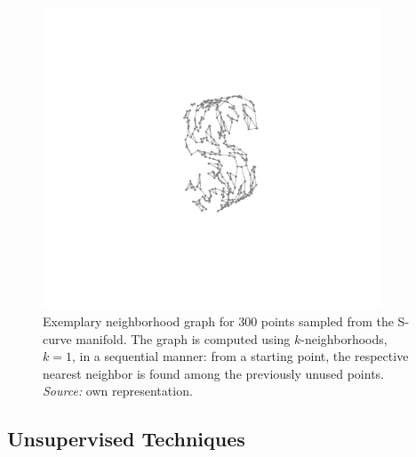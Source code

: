 \begin{minipage}[b]{0.45\textwidth}
  \begin{figure}[H]
    \centering
    \includegraphics[trim = 250 170 200 130, clip, %
      width = 0.9\textwidth]{figures/s-curve-connected}
    \caption[Exemplary neighborhood graph]{Exemplary neighborhood graph for 
    300 points sampled from the S-curve manifold. The graph is computed using 
    $k$-neighborhoods, $k = 1$, in a sequential manner: from a starting point, 
    the respective nearest neighbor is found among the previously unused points.
    \textit{Source:} own representation.}
    \label{fig:neighbor-graph}
  \end{figure}
\end{minipage}


\subsection{Unsupervised Techniques}
\label{techniques}

